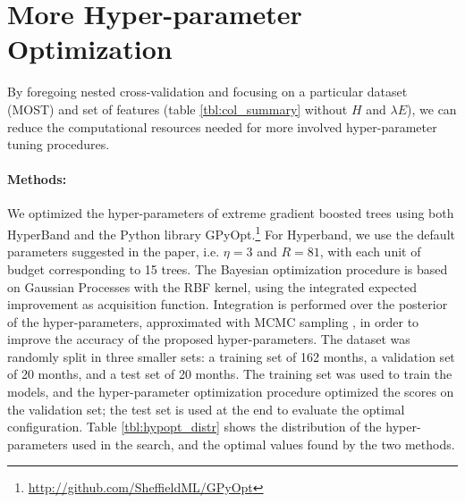 \documentclass[a4paper,11pt]{kth-mag}
\begin{document}
\section{More Hyper-parameter Optimization}
\label{apx:hyperopt}
By foregoing nested cross-validation and focusing on a particular dataset (MOST) and set of features (table \ref{tbl:col_summary} without $H$ and $\lambda E$), we can reduce the computational resources needed for more involved hyper-parameter tuning procedures.

\paragraph{Methods:} We optimized the hyper-parameters of extreme gradient boosted trees \citep{xgboost} using both HyperBand \citep{hyperband} and the Python library GPyOpt.\footnote{\url{http://github.com/SheffieldML/GPyOpt}} For Hyperband, we use the default parameters suggested in the paper, i.e. $\eta=3$ and $R=81$, with each unit of budget corresponding to 15 trees. The Bayesian optimization procedure is based on Gaussian Processes with the RBF kernel, using the integrated expected improvement as acquisition function. Integration is performed over the posterior of the hyper-parameters, approximated with MCMC sampling \citep{practical_gphypopt}, in order to improve the accuracy of the proposed hyper-parameters. The dataset was randomly split in three smaller sets: a training set of 162 months, a validation set of 20 months, and a test set of 20 months. The training set was used to train the models, and the hyper-parameter optimization procedure optimized the scores on the validation set; the test set is used at the end to evaluate the optimal configuration. Table \ref{tbl:hypopt_distr} shows the distribution of the hyper-parameters used in the search, and the optimal values found by the two methods.
\end{document}
